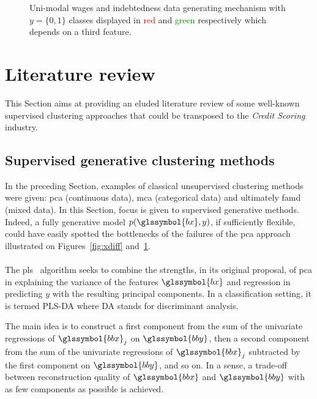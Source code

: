 \begin{figure}
\caption{\label{fig:ydiff} Uni-modal wages and indebtedness data generating mechanism with $y = \{0,1\}$ classes displayed in \textcolor{red}{red} and \textcolor{green}{green} respectively which depends on a third feature.}
\end{figure}








\section{Literature review} \label{sec:literature}

This Section aims at providing an eluded literature review of some well-known supervised clustering approaches that could be transposed to the \textit{Credit Scoring} industry.

\subsection{Supervised generative clustering methods}

In the preceding Section, examples of classical unsupervised clustering methods were given: \gls{pca} (continuous data), \gls{mca} (categorical data) and ultimately \gls{famd} (mixed data). In this Section, focus is given to supervised generative methods. Indeed, a fully generative model $p(\glssymbol{bx},y)$, if sufficiently flexible, could have easily spotted the bottlenecks of the failures of the \gls{pca} approach illustrated on Figures~\ref{fig:xdiff} and~\ref{fig:ydiff}.

\paragraph{}

The \gls{pls}~\cite{wold1984collinearity} algorithm seeks to combine the strengths, in its original proposal, of \gls{pca} in explaining the variance of the features $\glssymbol{bx}$ and regression in predicting $y$ with the resulting principal components. In a classification setting, it is termed PLS-DA where DA stands for discriminant analysis.

The main idea is to construct a first component from the sum of the univariate regressions of $\glssymbol{bbx}_j$ on $\glssymbol{bby}$, then a second component from the sum of the univariate regressions of $\glssymbol{bbx}_j$ subtracted by the first component on $\glssymbol{bby}$, and so on. In a sense, a trade-off between reconstruction quality of $\glssymbol{bbx}$ and $\glssymbol{bby}$ with as few components as possible is achieved.

